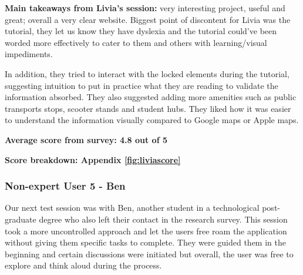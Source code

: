 \noindent\textbf{Main takeaways from Livia's session: }very interesting project,
useful and great; overall a very clear website. Biggest point of discontent for
Livia was the tutorial, they let us know they have dyslexia and the tutorial
could've been worded more effectively to cater to them and others with
learning/visual impediments.

In addition, they tried to interact with the locked elements during the
tutorial, suggesting intuition to put in practice what they are reading to
validate the information absorbed. They also suggested adding more amenities
such as public transports stops, scooter stands and student hubs. They liked how
it was easier to understand the information visually compared to Google maps or
Apple maps.

\textbf{Average score from survey: 4.8 out of 5}

\textbf{Score breakdown: Appendix \ref{fig:liviascore}}

\newpage{}

\subsubsection{Non-expert User 5 - Ben}
Our next test session was with Ben, another student in a technological
post-graduate degree who also left their contact in the research survey. This
session took a more uncontrolled approach and let the users free roam the
application without giving them specific tasks to complete. They were guided
them in the beginning and certain discussions were initiated but overall, the
user was free to explore and think aloud during the process.

